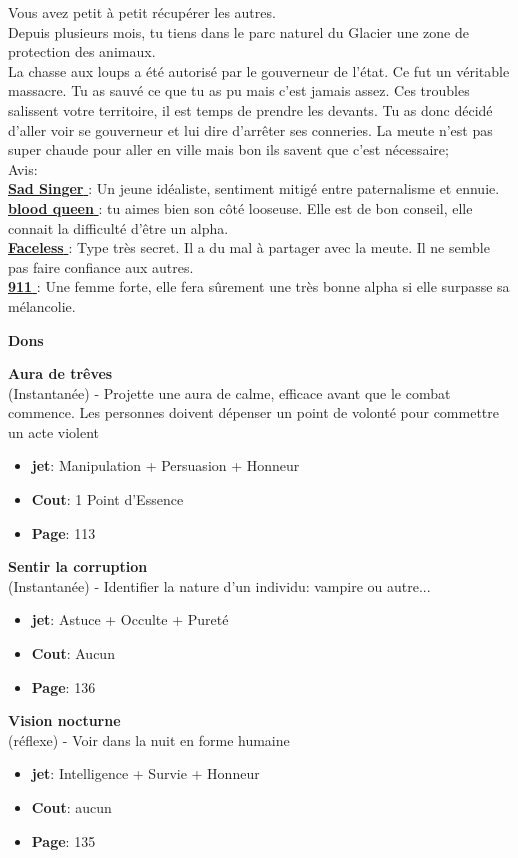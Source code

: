 \documentclass[oneside,12pt]{book}
\newcommand\don[6]{
\textbf{#1} \\
(#6) - #2
\begin{itemize}
\item{ \textbf{jet}: #3}
\item{ \textbf{Cout}: #4}
\item{ \textbf{Page}: #5}
\end{itemize}
\vspace{0.5cm}
}
\newcommand{\Mathew}{\textbf{Sad Singer} }
\newcommand{\Laura}{\textbf{blood queen} }
\newcommand{\Andy}{\textbf{Faceless} }
\newcommand{\Kelly}{\textbf{911} }
\begin{document}
\begin{flushleft}
\begin{description}
{Vous avez petit à petit récupérer les autres. \\
Depuis plusieurs mois, tu tiens dans le parc naturel du Glacier une zone de protection des animaux. \\
La chasse aux loups a été autorisé par le gouverneur de l'état. Ce fut un véritable massacre. Tu as sauvé ce que tu as pu mais c'est jamais assez. Ces troubles salissent votre territoire, il est temps de prendre les devants. Tu as donc décidé d'aller voir se gouverneur et lui dire d'arrêter ses conneries. La meute n'est pas super chaude pour aller en ville mais bon ils savent que c'est nécessaire; \\

Avis:\\
\underline{\Mathew} : Un jeune idéaliste, sentiment mitigé entre paternalisme et ennuie.\\
\underline{\Laura} : tu aimes bien son côté looseuse. Elle est de bon conseil, elle connait la difficulté d'être un alpha.  \\
\underline{\Andy} : Type très secret. Il a du mal à partager avec la meute. Il ne semble pas faire confiance aux autres. \\
\underline{\Kelly} : Une femme forte, elle fera sûrement une très bonne alpha si elle surpasse sa mélancolie. \\
}
\end{description}
\clearpage
\textbf{\large Dons} \\
\vspace{0.5cm}
\don{Aura de trêves}{Projette une aura de calme, efficace avant que le combat commence. Les personnes doivent dépenser un point de volonté pour commettre un acte violent}{Manipulation + Persuasion + Honneur}{1 Point d'Essence}{113}{Instantanée}
\don{Sentir la corruption}{Identifier la nature d'un individu: vampire ou autre...}{Astuce + Occulte + Pureté}{Aucun}{136}{Instantanée}
\don{Vision nocturne}{Voir dans la nuit en forme humaine}{Intelligence + Survie + Honneur}{aucun}{135}{réflexe}


\clearpage

\end{flushleft}
\end{document}
